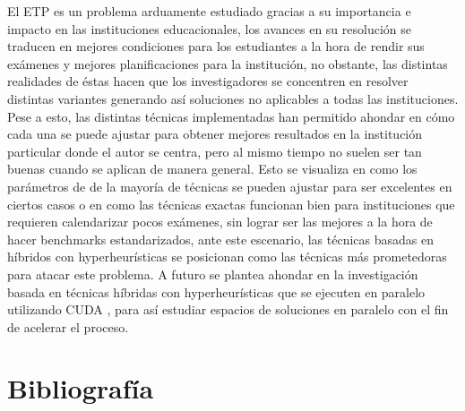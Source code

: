 \documentclass[letter, 10pt]{article}
\begin{document}
El ETP es un problema arduamente estudiado gracias a su importancia e impacto en las instituciones educacionales, los avances en su resolución se traducen en mejores condiciones para los estudiantes a la hora de rendir sus exámenes y mejores planificaciones para la institución, no obstante, las distintas realidades de éstas hacen que los investigadores se concentren en resolver distintas variantes generando así soluciones no aplicables a todas las instituciones. Pese a esto, las distintas técnicas implementadas han permitido ahondar en cómo cada una se puede ajustar para obtener mejores resultados en la institución particular donde el autor se centra, pero al mismo tiempo no suelen ser tan buenas cuando se aplican de manera general. Esto se visualiza en como los parámetros de de la mayoría de técnicas se pueden ajustar para ser excelentes en ciertos casos o en como las técnicas exactas funcionan bien para instituciones que requieren calendarizar pocos exámenes, sin lograr ser las mejores a la hora de hacer benchmarks estandarizados, ante este escenario, las técnicas basadas en híbridos con hyperheurísticas se posicionan como las técnicas más prometedoras para atacar este problema. A futuro se plantea ahondar en la investigación basada en técnicas híbridas con hyperheurísticas que se ejecuten en paralelo utilizando CUDA \cite{cuda}, para así estudiar espacios de soluciones en paralelo con el fin de acelerar el proceso.


\section{Bibliografía}


\end{document}
